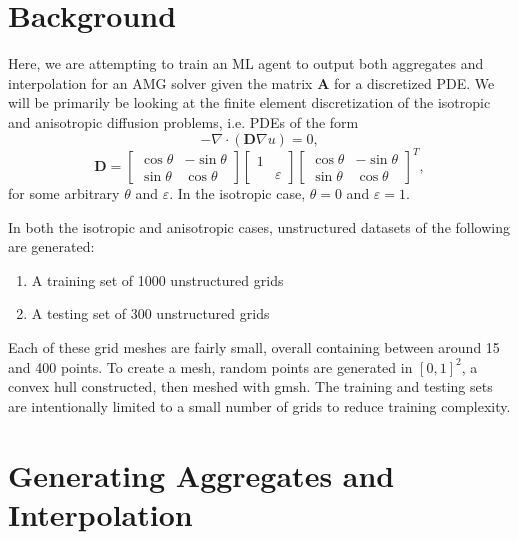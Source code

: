\documentclass{article}
\newcommand{\mat}[1]{\bm{{#1}}}
\newcommand{\grad}{\nabla}
\begin{document}
\section{Background}
Here, we are attempting to train an ML agent to output both aggregates and interpolation for an AMG solver given the matrix $\mat{A}$ for a discretized PDE.  We will be primarily be looking at the finite element discretization of the isotropic and anisotropic diffusion problems, i.e. PDEs of the form
\begin{equation}
  -\grad \cdot \left(\mat{D} \grad u\right) = 0,
\end{equation}
\begin{equation}
  \mat{D} = \begin{bmatrix} \cos \theta & -\sin \theta \\ \sin \theta & \cos \theta \end{bmatrix} \begin{bmatrix} 1 & \\ & \varepsilon \end{bmatrix} \begin{bmatrix} \cos \theta & -\sin \theta \\ \sin \theta & \cos \theta \end{bmatrix}^T,
\end{equation}
for some arbitrary $\theta$ and $\varepsilon$.  In the isotropic case, $\theta=0$ and $\varepsilon=1$.

In both the isotropic and anisotropic cases, unstructured datasets of the following are generated:
\begin{enumerate}
\item A training set of 1000 unstructured grids
\item A testing set of 300 unstructured grids
\end{enumerate}
Each of these grid meshes are fairly small, overall containing between around 15 and 400 points.  To create a mesh, random points are generated in $\left[0,1\right]^2$, a convex hull constructed, then meshed with gmsh.  The training and testing sets are intentionally limited to a small number of grids to reduce training complexity.

\section{Generating Aggregates and Interpolation}
\end{document}
